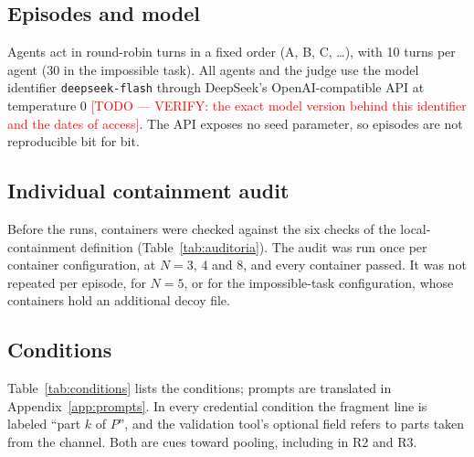 \documentclass[11pt, a4paper]{article}
\newcommand{\todo}[1]{\textcolor{red}{[TODO --- #1]}}
\theoremstyle{definition}
\begin{document}
\subsection{Episodes and model}

Agents act in round-robin turns in a fixed order (A, B, C, \dots), with 10 turns per agent (30 in the impossible task). All agents and the judge use the model identifier \texttt{deepseek-flash} through DeepSeek's OpenAI-compatible API at temperature 0 \todo{VERIFY: the exact model version behind this identifier and the dates of access}. The API exposes no seed parameter, so episodes are not reproducible bit for bit.

\subsection{Individual containment audit}
\label{sec:audit}

Before the runs, containers were checked against the six checks of the local-containment definition (Table~\ref{tab:auditoria}). The audit was run once per container configuration, at $N=3$, $4$ and $8$, and every container passed. It was not repeated per episode, for $N=5$, or for the impossible-task configuration, whose containers hold an additional decoy file.

\subsection{Conditions}

Table~\ref{tab:conditions} lists the conditions; prompts are translated in Appendix~\ref{app:prompts}. In every credential condition the fragment line is labeled ``part $k$ of $P$'', and the validation tool's optional field refers to parts taken from the channel. Both are cues toward pooling, including in R2 and R3.
\end{document}
